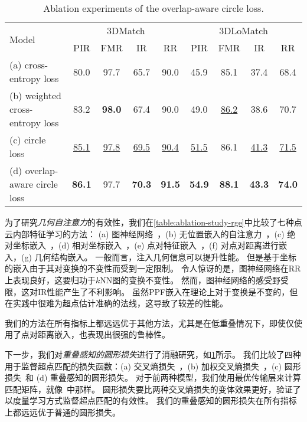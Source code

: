   \begin{table}[!t]
  \scriptsize
  \setlength{\tabcolsep}{2.5pt}
  \centering
  \begin{tabular}{l|cccc|cccc}
  \toprule
  \multirow{2}{*}{Model} & \multicolumn{4}{c|}{3DMatch} & \multicolumn{4}{c}{3DLoMatch} \\
   & PIR & FMR & IR & RR & PIR & FMR & IR & RR \\
  \midrule
  (a) cross-entropy loss & 80.0 & 97.7 & 65.7 & 90.0 & 45.9 & 85.1 & 37.4 & 68.4 \\
  (b) weighted cross-entropy loss & 83.2 & \textbf{98.0} & 67.4 & 90.0 & 49.0 & \underline{86.2} & 38.6 & 70.7 \\
  (c) circle loss & \underline{85.1} & \underline{97.8} & \underline{69.5} & \underline{90.4} & \underline{51.5} & 86.1 & \underline{41.3} & \underline{71.5} \\
  (d) overlap-aware circle loss & \textbf{86.1} & 97.7 & \textbf{70.3} & \textbf{91.5} & \textbf{54.9} & \textbf{88.1} & \textbf{43.3} & \textbf{74.0} \\
  \bottomrule
  \end{tabular}
  \vspace{-5pt}
  \caption{
  Ablation experiments of the overlap-aware circle loss.
  }
  \label{table:ablation-study-ocl}
  \vspace{-10pt}
  \end{table}

为了研究\emph{几何自注意力}的有效性，我们在\ref{table:ablation-study-rge}中比较了七种点云内部特征学习的方法：
(a) 图神经网络~\cite{huang2021predator}，(b) 无位置嵌入的自注意力~\cite{yu2021cofinet}，(c) 绝对坐标嵌入~\cite{sarlin2020superglue}，(d) 相对坐标嵌入~\cite{zhao2021point}，(e) 点对特征嵌入~\cite{drost2010model,raposo2017using}，(f) 对点对距离进行嵌入，(g) 几何结构嵌入。
一般而言，注入几何信息可以提升性能。
但是基于坐标的嵌入由于其对变换的不变性而受到一定限制。
令人惊讶的是，图神经网络在RR上表现良好，这要归功于$k$NN图的变换不变性。
然而，图神经网络的感受野受限，这对IR性能产生了不利影响。
虽然PPF嵌入在理论上对于变换是不变的，但在实践中很难为超点估计准确的法线，这导致了较差的性能。

我们的方法在所有指标上都远远优于其他方法，尤其是在低重叠情况下，即使仅使用了点对距离嵌入，也表现出很强的鲁棒性。

下一步，我们对\emph{重叠感知的圆形损失}进行了消融研究，如\ref{table:ablation-study-ocl}所示。
我们比较了四种用于监督超点匹配的损失函数：(a) 交叉熵损失~\cite{sarlin2020superglue}，(b) 加权交叉熵损失~\cite{yu2021cofinet}，(c) 圆形损失~\cite{sun2020circle}和 (d) 重叠感知的圆形损失。
对于前两种模型，我们使用最优传输层来计算匹配矩阵，就像~\cite{yu2021cofinet}中那样。
圆形损失要比两种交叉熵损失的变体效果更好，验证了以度量学习方式监督超点匹配的有效性。
我们的重叠感知的圆形损失在所有指标上都远远优于普通的圆形损失。

